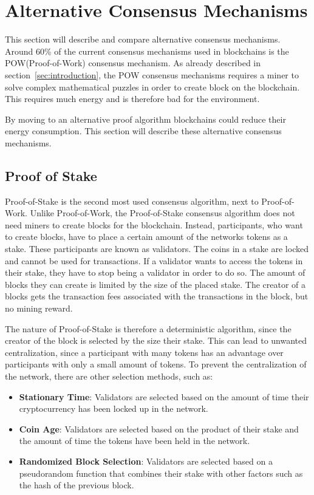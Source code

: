 

\section{Alternative Consensus Mechanisms}\label{sec:alternative-consensus-mechanisms}
This section will describe and compare alternative consensus mechanisms.
Around 60\% of the current consensus mechanisms used in blockchains is the POW(Proof-of-Work) consensus mechanism.
As already described in section\ \ref{sec:introduction}, the POW consensus mechanisms requires a miner to solve complex mathematical puzzles in order to create block on the blockchain.
This requires much energy and is therefore bad for the environment.\cite{overview-of-sustainablity-blockchains,moralis-pow-enery-consumption}

By moving to an alternative proof algorithm blockchains could reduce their energy consumption.
This section will describe these alternative consensus mechanisms.\cite{4-ways-to-counter-blockchains-energy-consumption}

\subsection{Proof of Stake}\label{subsec:proof-of-stake}
Proof-of-Stake is the second most used consensus algorithm, next to Proof-of-Work.
Unlike Proof-of-Work, the Proof-of-Stake consensus algorithm does not need miners to create blocks for the blockchain.
Instead, participants, who want to create blocks, have to place a certain amount of the networks tokens as a stake.
These participants are known as validators.
The coins in a stake are locked and cannot be used for transactions.
If a validator wants to access the tokens in their stake, they have to stop being a validator in order to do so.
The amount of blocks they can create is limited by the size of the placed stake.
The creator of a blocks gets the transaction fees associated with the transactions in the block, but no mining reward.\cite{bitpanda-pos}

The nature of Proof-of-Stake is therefore a deterministic algorithm, since the creator of the block is selected by the size their stake.
This can lead to unwanted centralization, since a participant with many tokens has an advantage over participants with only a small amount of tokens.
To prevent the centralization of the network, there are other selection methods, such as:

\begin{itemize}
    \item\textbf{Stationary Time}: Validators are selected based on the amount of time their cryptocurrency has been locked up in the network.\cite{bitpanda-pos}
    \item\textbf{Coin Age}: Validators are selected based on the product of their stake and the amount of time the tokens have been held in the network.\cite{bitflyer-glossary}
    \item\textbf{Randomized Block Selection}: Validators are selected based on a pseudorandom function that combines their stake with other factors such as the hash of the previous block.\cite{cryptonews-pos}
\end{itemize}

